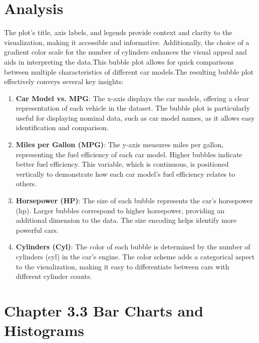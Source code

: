 \documentclass{article}\usepackage[]{graphicx}\usepackage[]{xcolor}
\begin{document}
\section{Analysis}
The plot's title, axis labels, and legends provide context and clarity to the visualization, making it accessible and informative. Additionally, the choice of a gradient color scale for the number of cylinders enhances the visual appeal and aids in interpreting the data.This bubble plot allows for quick comparisons between multiple characteristics of different car models.The resulting bubble plot effectively conveys several key insights:
\begin{enumerate}
\item \textbf{Car Model vs. MPG}: The x-axis displays the car models, offering a clear representation of each vehicle in the dataset. The bubble plot is particularly useful for displaying nominal data, such as car model names, as it allows easy identification and comparison.
\item \textbf{Miles per Gallon (MPG)}: The y-axis measures miles per gallon, representing the fuel efficiency of each car model. Higher bubbles indicate better fuel efficiency. This variable, which is continuous, is positioned vertically to demonstrate how each car model's fuel efficiency relates to others.
\item \textbf{Horsepower (HP)}: The size of each bubble represents the car's horsepower (hp). Larger bubbles correspond to higher horsepower, providing an additional dimension to the data. The size encoding helps identify more powerful cars.
\item \textbf{Cylinders (Cyl)}: The color of each bubble is determined by the number of cylinders (cyl) in the car's engine. The color scheme adds a categorical aspect to the visualization, making it easy to differentiate between cars with different cylinder counts.
\end{enumerate}


\section*{Chapter 3.3 Bar Charts and Histograms}
\end{document}
